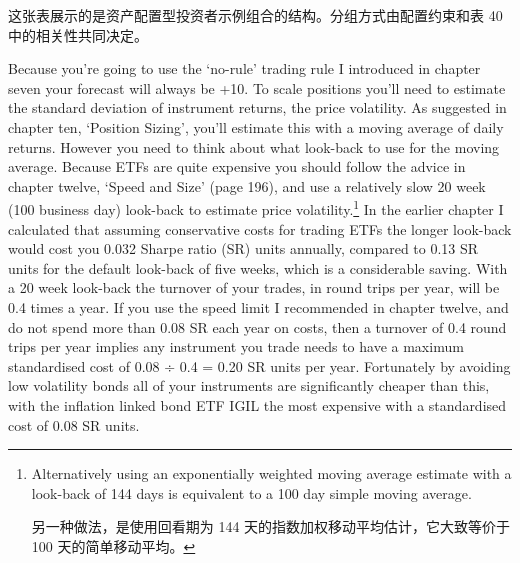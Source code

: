 \begin{chineseblock}这张表展示的是资产配置型投资者示例组合的结构。分组方式由配置约束和表 40 中的相关性共同决定。\end{chineseblock}


\begin{englishblock} Because you're going to use the ‘no-rule' trading rule I introduced in chapter seven your forecast will always be +10. To scale positions you'll need to estimate the standard deviation of instrument returns, the price volatility. As suggested in chapter ten, ‘Position Sizing', you'll estimate this with a moving average of daily returns. However you need to think about what look-back to use for the moving average. Because ETFs are quite expensive you should follow the advice in chapter twelve, ‘Speed and Size' (page 196), and use a relatively slow 20 week (100 business day) look-back to estimate price volatility.\footnote{Alternatively using an exponentially weighted moving average estimate with a look-back of 144 days is equivalent to a 100 day simple moving average. \par 另一种做法，是使用回看期为 144 天的指数加权移动平均估计，它大致等价于 100 天的简单移动平均。} In the earlier chapter I calculated that assuming conservative costs for trading ETFs the longer look-back would cost you 0.032 Sharpe ratio (SR) units annually, compared to 0.13 SR units for the default look-back of five weeks, which is a considerable saving. With a 20 week look-back the turnover of your trades, in round trips per year, will be 0.4 times a year. If you use the speed limit I recommended in chapter twelve, and do not spend more than 0.08 SR each year on costs, then a turnover of 0.4 round trips per year implies any instrument you trade needs to have a maximum standardised cost of 0.08 ÷ 0.4 = 0.20 SR units per year. Fortunately by avoiding low volatility bonds all of your instruments are significantly cheaper than this, with the inflation linked bond ETF IGIL the most expensive with a standardised cost of 0.08 SR units. \end{englishblock}

